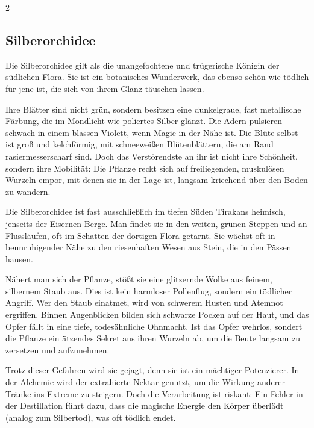 \begin{multicols}{2}


    \subsection*{Silberorchidee}

    Die Silberorchidee gilt als die unangefochtene und trügerische Königin der südlichen Flora. Sie ist ein botanisches Wunderwerk, das ebenso schön wie tödlich für jene ist, die sich von ihrem Glanz täuschen lassen.

Ihre Blätter sind nicht grün, sondern besitzen eine dunkelgraue, fast metallische Färbung, die im Mondlicht wie poliertes Silber glänzt. Die Adern pulsieren schwach in einem blassen Violett, wenn Magie in der Nähe ist. Die Blüte selbst ist groß und kelchförmig, mit schneeweißen Blütenblättern, die am Rand rasiermesserscharf sind. Doch das Verstörendste an ihr ist nicht ihre Schönheit, sondern ihre Mobilität: Die Pflanze reckt sich auf freiliegenden, muskulösen Wurzeln empor, mit denen sie in der Lage ist, langsam kriechend über den Boden zu wandern.

Die Silberorchidee ist fast ausschließlich im tiefen Süden Tirakans heimisch, jenseits der Eisernen Berge. Man findet sie in den weiten, grünen Steppen und an Flussläufen, oft im Schatten der dortigen Flora getarnt. Sie wächst oft in beunruhigender Nähe zu den riesenhaften Wesen aus Stein, die in den Pässen hausen.

Nähert man sich der Pflanze, stößt sie eine glitzernde Wolke aus feinem, silbernem Staub aus. Dies ist kein harmloser Pollenflug, sondern ein tödlicher Angriff. Wer den Staub einatmet, wird von schwerem Husten und Atemnot ergriffen. Binnen Augenblicken bilden sich schwarze Pocken auf der Haut, und das Opfer fällt in eine tiefe, todesähnliche Ohnmacht. Ist das Opfer wehrlos, sondert die Pflanze ein ätzendes Sekret aus ihren Wurzeln ab, um die Beute langsam zu zersetzen und aufzunehmen.

Trotz dieser Gefahren wird sie gejagt, denn sie ist ein mächtiger Potenzierer. In der Alchemie wird der extrahierte Nektar genutzt, um die Wirkung anderer Tränke ins Extreme zu steigern. Doch die Verarbeitung ist riskant: Ein Fehler in der Destillation führt dazu, dass die magische Energie den Körper überlädt (analog zum Silbertod), was oft tödlich endet.


\end{multicols}
